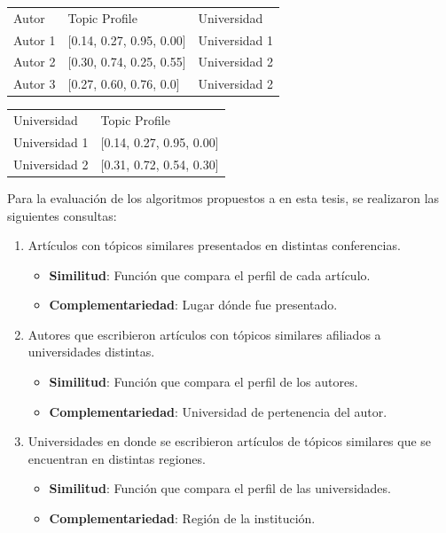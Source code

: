 \begin{table}[H]
\begin{tabular}{lll}
	Autor & Topic Profile & Universidad \\
	Autor 1 & $[$0.14, 0.27, 0.95, 0.00$]$ & Universidad 1 \\
	Autor 2 & $[$0.30, 0.74, 0.25, 0.55$]$ & Universidad 2 \\
	Autor 3 & $[$0.27, 0.60, 0.76, 0.0$]$ & Universidad 2 \\
\end{tabular}
\label{tabla:topicProfileEj2}
\end{table}

\begin{table}[H]
\begin{tabular}{ll}
	Universidad & Topic Profile \\
	Universidad 1 & $[$0.14, 0.27, 0.95, 0.00$]$ \\
	Universidad 2 & $[$0.31, 0.72, 0.54, 0.30$]$ \\
\end{tabular}
\label{tabla:topicProfileEj3}
\end{table}

Para la evaluación de los algoritmos propuestos a en esta tesis, se realizaron las siguientes consultas:
\begin{enumerate}
	\item
		Artículos con tópicos similares presentados en distintas conferencias. \label{busqueda:articulos}
		\begin{itemize}
			\item \textbf{Similitud}: Función que compara el perfil de cada artículo.
			\item \textbf{Complementariedad}: Lugar dónde fue presentado.
		\end{itemize}

	\item
	Autores que escribieron artículos con tópicos similares afiliados a universidades distintas. \label{busqueda:autores}
	\begin{itemize}
		\item \textbf{Similitud}: Función que compara el perfil de los autores.
		\item \textbf{Complementariedad}: Universidad de pertenencia del autor.
	\end{itemize}

	\item 
	Universidades en donde se escribieron artículos de tópicos similares que se encuentran en distintas regiones. \label{busqueda:universidades}
	\begin{itemize}
		\item \textbf{Similitud}: Función que compara el perfil de las universidades.
		\item \textbf{Complementariedad}: Región de la institución.
	\end{itemize}
\end {enumerate}


